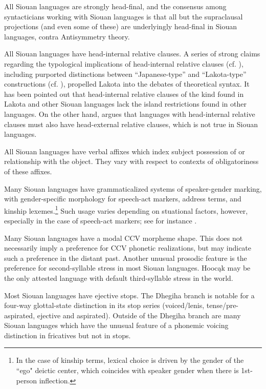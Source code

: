 \begin{refsection}
All Siouan languages are strongly head-final, and the consensus among syntacticians working with Siouan languages is that all but the supraclausal projections (and even some of these) are underlyingly head-final in Siouan languages, contra  Antisymmetry theory.


All Siouan languages have head-internal relative clauses. A series of strong claims regarding the typological implications of head-internal relative clauses (cf. \citealt{Cole1987,Murasugi2000}), including purported distinctions between ``Japanese-type'' and ``Lakota-type'' constructions (cf. \citealt{Watanabe2004,Williamson1987,Bonneau1992}), propelled Lakota into the debates of theoretical syntax. It has been pointed out that head-internal relative clauses of the kind found in Lakota and other Siouan languages lack the island restrictions found in other languages. On the other hand, \citet{Murasugi2000} argues that languages with head-internal relative clauses must also have head-external relative clauses, which is not true in Siouan languages.


All Siouan languages have verbal affixes which index subject possession of or relationship with the object. They vary with respect to contexts of obligatoriness of these affixes.


Many Siouan languages have grammaticalized systems of speaker-gender marking, with gender-specific morphology for speech-act markers, address terms, and kinship lexemes.\footnote{In the case of kinship terms, lexical choice is driven by the gender of the ``ego" deictic center, which coincides with speaker gender when there is 1st-person inflection.} Such usage varies depending on stuational factors, however, especially in the case of speech-act markers; see for instance \citet{Trechter1995}.   


Many Siouan languages have a modal CCV morpheme shape. This does not necessarily imply a preference for CCV phonetic realizations, but may indicate such a preference in the distant past. Another unusual prosodic feature is the preference for second-syllable stress in most Siouan languages. Hooc\k{a}k may be the only attested language with default third-syllable stress in the world.


Most Siouan languages have ejective stops. The Dhegiha branch is notable for a four-way glottal-state distinction in its stop series (voiced/lenis, tense/pre-aspirated, ejective and aspirated). Outside of the Dhegiha branch are many Siouan languages which have the unusual feature of a phonemic voicing distinction in fricatives but not in stops.



\end{refsection}
